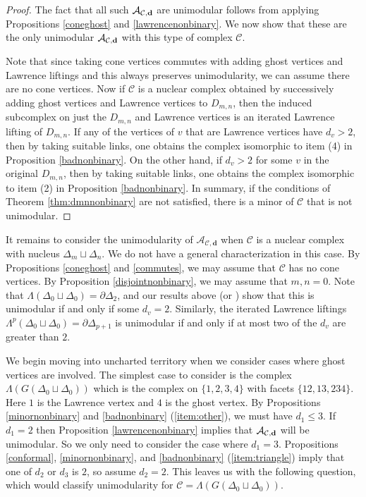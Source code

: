 \documentclass[letterpaper,12pt]{amsart}
\theoremstyle{plain}
\theoremstyle{definition}
\theoremstyle{remark}
\newcommand{\bfd}{\mathbf{d}}
\newcommand{\calc}{\mathcal{C}}
\begin{document}
\begin{proof}
The fact that all such $\mathcal{A}_{\calc, {\bf d}}$
are unimodular follows from applying Propositions
\ref{coneghost}  and \ref{lawrencenonbinary}.  We now show that
these are the only unimodular $\mathcal{A}_{\calc, {\bf d}}$
with this type of complex $\calc$.

Note that since taking cone vertices commutes with adding ghost vertices
and Lawrence liftings and this always preserves unimodularity,
we can assume there are no cone vertices.  
Now if $\calc$ is a nuclear complex obtained by successively adding
ghost vertices and Lawrence vertices to $D_{m,n}$, then the
induced subcomplex on just the $D_{m,n}$ and Lawrence vertices
is an iterated Lawrence lifting of $D_{m,n}$.  If any
of the vertices of $v$ that are Lawrence vertices have $d_{v} > 2$,
then by taking suitable links, one obtains the complex
isomorphic to item (4) in Proposition \ref{badnonbinary}.
On the other hand, if $d_{v} > 2$ for some $v $ in the original
$D_{m,n}$, then by taking suitable links, one obtains the complex
isomorphic to item (2) in  Proposition \ref{badnonbinary}.
In summary, if the conditions of Theorem \ref{thm:dmnnonbinary}
are not satisfied, there is a minor of $\calc$ that is not unimodular.
\end{proof}

It remains to consider the unimodularity of $\mathcal{A}_{\calc,\bfd}$
when $\calc$ is a nuclear complex with nucleus $\Delta_{m} \sqcup \Delta_{n}$.
We do not have a general characterization in this case.
By Propositions \ref{coneghost} and \ref{commutes}, we may assume that $\calc$ has no cone vertices.  By Proposition \ref{disjointnonbinary},
we may assume that $m, n = 0$.
Note that $\Lambda( \Delta_{0} \sqcup \Delta_{0}) = \partial\Delta_2$, and
our results above (or \cite{ohsugi-hibi2010}) show that this
is unimodular if and only if some $d_{v} = 2$.  Similarly, the iterated 
Lawrence liftings $\Lambda^{p}( \Delta_{0} \sqcup \Delta_{0}) = 
\partial\Delta_{p+1}$ is unimodular if and only if at most two 
of the $d_{v}$ are greater than $2$.


We begin moving into uncharted territory when we consider cases where ghost 
vertices are involved. 
The simplest case to consider is the complex $\Lambda(G( \Delta_{0} \sqcup \Delta_{0}))$ which is the complex on $\{1,2,3,4\}$ with facets $\{12,13,234\}$.
Here $1$ is the Lawrence vertex and $4$ is the ghost vertex.
By Propositions \ref{minornonbinary} and \ref{badnonbinary} (\ref{item:other}),
we must have $d_1 \le 3$.
If $d_1 = 2$ then Proposition \ref{lawrencenonbinary} implies that $\mathcal{A}_{\mathcal{C},{\bf d}}$ will be unimodular.
So we only need to consider the case where $d_1 = 3$.
Propositions \ref{conformal}, \ref{minornonbinary}, and \ref{badnonbinary} (\ref{item:triangle}) imply that
one of $d_2$ or $d_3$ is $2$, so assume $d_2 = 2$.
This leaves us with the following question, which would classify
unimodularity for $\calc = \Lambda(G( \Delta_{0} \sqcup \Delta_{0}))$.
\end{document}
